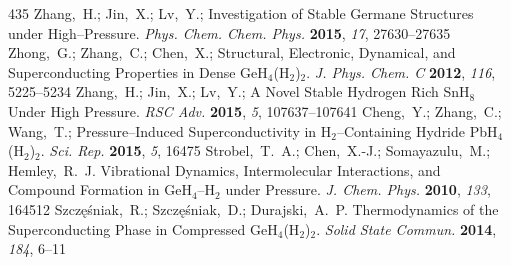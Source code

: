 \documentclass[12pt,letterpaper,oneside]{article}
\begin{document}
\begin{mcitethebibliography}{435}
Zhang,~H.; Jin,~X.; Lv,~Y.;   Investigation of
  Stable Germane Structures under High--Pressure. \emph{Phys. Chem. Chem.
  Phys.} \textbf{2015}, \emph{17}, 27630--27635\relax
\mciteBstWouldAddEndPuncttrue
\mciteSetBstMidEndSepPunct{\mcitedefaultmidpunct}
{\mcitedefaultendpunct}{\mcitedefaultseppunct}\relax
\EndOfBibitem
{}
Zhong,~G.; Zhang,~C.; Chen,~X.;   Structural,
  Electronic, Dynamical, and Superconducting Properties in Dense
  GeH$_4$(H$_2$)$_2$. \emph{J. Phys. Chem. C} \textbf{2012}, \emph{116},
  5225--5234\relax
\mciteBstWouldAddEndPuncttrue
\mciteSetBstMidEndSepPunct{\mcitedefaultmidpunct}
{\mcitedefaultendpunct}{\mcitedefaultseppunct}\relax
\EndOfBibitem
{}
Zhang,~H.; Jin,~X.; Lv,~Y.;   A Novel Stable
  Hydrogen Rich SnH$_{8}$ Under High Pressure. \emph{RSC Adv.} \textbf{2015},
  \emph{5}, 107637--107641\relax
\mciteBstWouldAddEndPuncttrue
\mciteSetBstMidEndSepPunct{\mcitedefaultmidpunct}
{\mcitedefaultendpunct}{\mcitedefaultseppunct}\relax
\EndOfBibitem
{}
Cheng,~Y.; Zhang,~C.; Wang,~T.; 
  Pressure--Induced Superconductivity in H$_2$--Containing Hydride
  PbH$_4$(H$_2$)$_2$. \emph{Sci. Rep.} \textbf{2015}, \emph{5}, 16475\relax
\mciteBstWouldAddEndPuncttrue
\mciteSetBstMidEndSepPunct{\mcitedefaultmidpunct}
{\mcitedefaultendpunct}{\mcitedefaultseppunct}\relax
\EndOfBibitem
{}
Strobel,~T.~A.; Chen,~X.-J.; Somayazulu,~M.; Hemley,~R.~J. Vibrational
  Dynamics, Intermolecular Interactions, and Compound Formation in
  GeH$_4$--H$_2$ under Pressure. \emph{J. Chem. Phys.} \textbf{2010},
  \emph{133}, 164512\relax
\mciteBstWouldAddEndPuncttrue
\mciteSetBstMidEndSepPunct{\mcitedefaultmidpunct}
{\mcitedefaultendpunct}{\mcitedefaultseppunct}\relax
\EndOfBibitem
{}
Szcz{\k e}{\'s}niak,~R.; Szcz{\k e}{\'s}niak,~D.; Durajski,~A.~P.
  Thermodynamics of the Superconducting Phase in Compressed GeH$_4$(H$_2$)$_2$.
  \emph{Solid State Commun.} \textbf{2014}, \emph{184}, 6--11\relax
\mciteBstWouldAddEndPuncttrue
\mciteSetBstMidEndSepPunct{\mcitedefaultmidpunct}
{\mcitedefaultendpunct}{\mcitedefaultseppunct}\relax
\EndOfBibitem

\end{mcitethebibliography}
\end{document}
